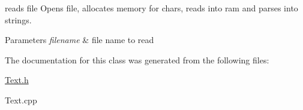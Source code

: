 reads file Opens file, allocates memory for chars, reads into ram and parses into strings. 


\begin{DoxyParams}{Parameters}
{\em filename} & file name to read \\
\hline
\end{DoxyParams}


The documentation for this class was generated from the following files\+:\begin{DoxyCompactItemize}
\item 
\hyperlink{Text_8h}{Text.\+h}\item 
Text.\+cpp\end{DoxyCompactItemize}
